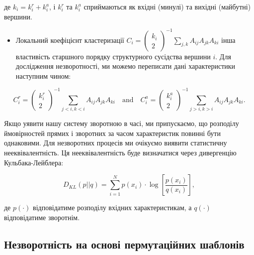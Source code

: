 \documentclass[
  letterpaper,
]{report}
\providecommand{\tightlist}{%
  \setlength{\itemsep}{0pt}\setlength{\parskip}{0pt}}\usepackage{longtable,booktabs,array}
\begin{document}
де \(k_{i} = k_{i}^{r} + k_{i}^{a}\), і \(k_{i}^{r}\) та \(k_{i}^{a}\)
сприймаються як вхідні (минулі) та вихідні (майбутні) вершини.

\begin{itemize}
\tightlist
\item
  Локальний коефіцієнт кластеризації
  \(C_{i} = \left( \begin{matrix} k_{i}\\ 2 \end{matrix} \right)^{-1} \sum_{j,k} A_{ij}A_{jk}A_{ki}\)
  інша властивість старшного порядку структурного сусідства вершини
  \(i\). Для дослідження незворотності, ми можемо переписати дані
  характеристики наступним чином:
\end{itemize}

\[ 
C_{i}^{r} = \left( \begin{matrix} k_{i}^{r}\\ 2 \end{matrix} \right)^{-1} \sum_{j<i,k<i} A_{ij}A_{jk}A_{ki} \quad \textrm{and} \quad C_{i}^{a} = \left( \begin{matrix} k_{i}^{a}\\ 2 \end{matrix} \right)^{-1} \sum_{j>i,k>i} A_{ij}A_{jk}A_{ki}. 
\]

Якщо уявити нашу систему зворотною в часі, ми припускаємо, що розподілу
ймовірностей прямих і зворотних за часом характеристик повинні бути
однаковими. Для незворотних процесів ми очікуємо виявити статистичну
нееквівалентність. Ця нееквівалентність буде визначатися через
дивергенцію Кульбака-Лейблера:

\[ 
D_{KL}(p||q) = \sum_{i=1}^{N} p(x_{i}) \cdot \log{\left[ \frac{p(x_{i})}{q(x_{i})} \right]}, 
\]

де \(p(\cdot)\) відповідатиме розподілу вхідних характеристикам, а
\(q(\cdot)\) відповідатиме зворотнім.

\hypertarget{ux43dux435ux437ux432ux43eux440ux43eux442ux43dux456ux441ux442ux44c-ux43dux430-ux43eux441ux43dux43eux432ux456-ux43fux435ux440ux43cux443ux442ux430ux446ux456ux439ux43dux438ux445-ux448ux430ux431ux43bux43eux43dux456ux432}{%
\subsection{Незворотність на основі пермутаційних
шаблонів}\label{ux43dux435ux437ux432ux43eux440ux43eux442ux43dux456ux441ux442ux44c-ux43dux430-ux43eux441ux43dux43eux432ux456-ux43fux435ux440ux43cux443ux442ux430ux446ux456ux439ux43dux438ux445-ux448ux430ux431ux43bux43eux43dux456ux432}}
\end{document}

